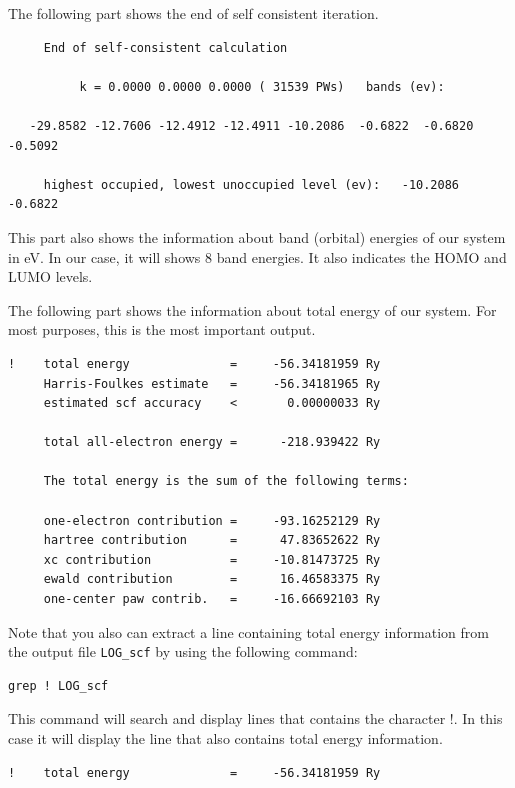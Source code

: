 \documentclass[12pt,english]{paper}
\begin{document}
The following part shows the end of self consistent iteration.

\begin{lstlisting}
     End of self-consistent calculation

          k = 0.0000 0.0000 0.0000 ( 31539 PWs)   bands (ev):

   -29.8582 -12.7606 -12.4912 -12.4911 -10.2086  -0.6822  -0.6820  -0.5092

     highest occupied, lowest unoccupied level (ev):   -10.2086   -0.6822
\end{lstlisting}


This part also shows the information about band (orbital) energies
of our system in eV. In our case, it will shows 8 band energies. It
also indicates the HOMO and LUMO levels.

The following part shows the information about total energy of our
system. For most purposes, this is the most important output.

\begin{lstlisting}
!    total energy              =     -56.34181959 Ry
     Harris-Foulkes estimate   =     -56.34181965 Ry
     estimated scf accuracy    <       0.00000033 Ry

     total all-electron energy =      -218.939422 Ry

     The total energy is the sum of the following terms:

     one-electron contribution =     -93.16252129 Ry
     hartree contribution      =      47.83652622 Ry
     xc contribution           =     -10.81473725 Ry
     ewald contribution        =      16.46583375 Ry
     one-center paw contrib.   =     -16.66692103 Ry
\end{lstlisting}


Note that you also can extract a line containing total energy information
from the output file \texttt{LOG\_scf} by using the following command:
\begin{lstlisting}
grep ! LOG_scf
\end{lstlisting}


This command will search and display lines that contains the character
!. In this case it will display the line that also contains total
energy information.

\begin{lstlisting}
!    total energy              =     -56.34181959 Ry
\end{lstlisting}
\end{document}
